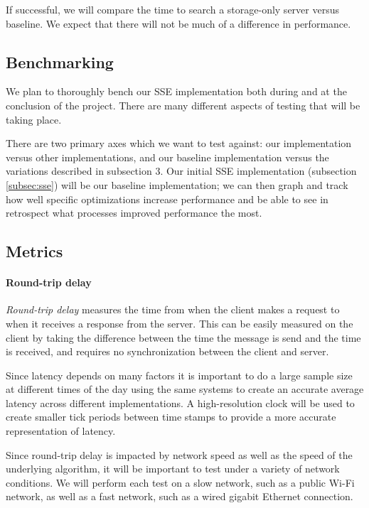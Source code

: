 If successful, we will compare the time to search a storage-only server versus baseline. We expect that there will not be much of a difference in performance.

\subsection {Benchmarking}
\label{subsec:benchmark}

We plan to thoroughly bench our SSE implementation both during and at the conclusion of the project.
There are many different aspects of testing that will be taking place.


There are two primary axes which we want to test against: our implementation versus other implementations, and our baseline implementation versus the variations described in subsection 3.
Our initial SSE implementation (subsection \ref{subsec:sse}) will be our baseline implementation;
we can then graph and track how well specific optimizations increase performance and be able to see in retrospect what processes improved performance the most.

\subsection {Metrics}

\paragraph {Round-trip delay}

\textit{Round-trip delay} measures the time from when the client makes a request to when it receives a response from the server.
This can be easily measured on the client by taking the difference between the time the message is send and the time is received, and requires no synchronization between the client and server.

Since latency depends on many factors it is important to do a large sample size at different times of the day using the same systems to create an accurate average latency across different implementations. 
A high-resolution clock will be used to create smaller tick periods between time stamps to provide a more accurate representation of latency. 

Since round-trip delay is impacted by network speed as well as the speed of the underlying algorithm, it will be important to test under a variety of network conditions.
We will perform each test on a slow network, such as a public Wi-Fi network, as well as a fast network, such as a wired gigabit Ethernet connection.

